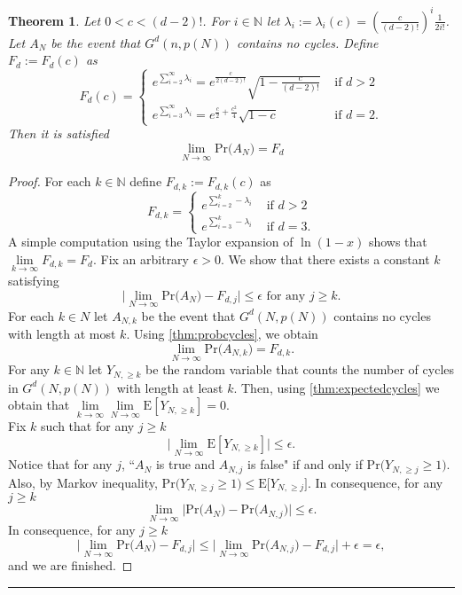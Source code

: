 \documentclass[11pt,notitlepage,a4paper]{article}
\newtheorem{theorem}{Theorem}[section]
\theoremstyle{definition}
\newcommand{\N}{\mathbb{N}}
\newcommand{\LN}{\lim\limits_{N\to \infty}}
\begin{document}
\begin{theorem} 
	Let $0<c<(d-2)!$. For $i\in \N$ let 
	$\lambda_i:=\lambda_i(c)=\left(\frac{c}{(d-2)!}\right)^i\frac{1}{2i!}$. 
	Let $A_N$ be the event that $G^d(n,p(N))$ contains no cycles. 
	Define $F_d:=F_d(c)$ as
	\[
	F_d(c)=\begin{cases}
	e^{\sum_{i=2}^{\infty} \lambda_i}=
	e^{\frac{c}{2(d-2)!}}\sqrt{1-\frac{c}{(d-2)!}} & \text{ if } d>2\\
	e^{\sum_{i=3}^{\infty} \lambda_i}=
	e^{\frac{c}{2}+\frac{c^2}{4}}\sqrt{1-c} & \text{ if } d=2.
	\end{cases}
	\]
	Then it is satisfied
	\[
	\LN \mathrm{Pr}\big(A_N \big)=F_d
	\]	
\end{theorem} 
\begin{proof}
	For each $k\in \N$ define $F_{d,k}:=F_{d,k}(c)$ as 
	\[
	F_{d,k}=\begin{cases}
	e^{\sum_{i=2}^k -\lambda_i} 
	& \text{ if } d>2\\
	e^{\sum_{i=3}^k -\lambda_i} 
	& \text{ if } d=3.
	\end{cases}
	\]
	A simple computation using the Taylor expansion
	of $\ln(1-x)$ shows that $\lim\limits_{k\to \infty} F_{d,k}=F_d$.
	Fix an arbitrary $\epsilon>0$. We show that there exists a 
	constant $k$ satisfying
	\[
	\Big| \LN \mathrm{Pr}\big(A_N \big) - F_{d,j} \Big|\leq \epsilon 
	\text{ for any } j\geq k.
	\]
	For each $k\in N$ let $A_{N,k}$ be the event that $G^d(N,p(N))$ contains 
	no cycles with length at most $k$. Using \cref{thm:probcycles}, we obtain 
	\[
	\LN \mathrm{Pr}\big(A_{N,k}\big)=F_{d,k}.\]
	For any $k\in \N$ let $Y_{N,\geq k}$ be the random variable that
	counts the number of cycles in $G^d(N,p(N))$ with length at least $k$. 
	Then, using \cref{thm:expectedcycles} we obtain that 
	$\lim\limits_{k\to \infty}	\LN \mathrm{E}[Y_{N,\geq k}]=0$. \\
	Fix $k$ such that for any $j\geq k$
	\[
	\Big|\LN \mathrm{E}[Y_{N,\geq k}]\Big| \leq \epsilon.
	\]
	Notice that for any $j$, ``$A_N$ is true and $A_{N,j}$ is false"
	if and only if $\mathrm{Pr}\big(Y_{N,\geq j} \geq 1\big)$. 
	Also, by Markov inequality, 
	$\mathrm{Pr}\big(Y_{N,\geq j} \geq 1\big)
	\leq \mathrm{E}\big[Y_{N,\geq j}\big]$.
	In consequence, for any $j\geq k$
	\[
	\LN \Big|\mathrm{Pr}\big(A_N\big)- \mathrm{Pr}\big(A_{N,j}\big)\Big|
	\leq \epsilon.
	\]
	In consequence, for any $j\geq k$
	\[ \Big| \LN \mathrm{Pr}\big(A_N \big) - F_{d,j} \Big|
	\leq  \Big| \LN \mathrm{Pr}\big(A_{N,j} \big) - F_{d,j} \Big| +
	\epsilon = \epsilon,	
	\]
	and we are finished. 
\end{proof}
	\noindent\rule{2cm}{0.4pt}\par
\end{document}
